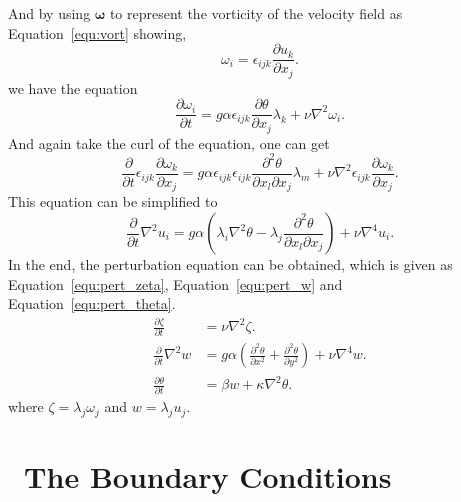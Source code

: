 And by using \(\boldsymbol{\omega}\) to represent the vorticity of the velocity field as Equation~\ref{equ:vort} showing, 
\begin{equation}
\omega_i=\epsilon_{ijk}\frac{\partial u_k}{\partial x_j}.
\label{equ:vort}
\end{equation}
we have the equation
\begin{equation}
\frac{\partial \omega_i}{\partial t}=g\alpha\epsilon_{ijk}\frac{\partial \theta}{\partial x_j}\lambda_k+\nu\nabla^2\omega_i.
\end{equation}
And again take the curl of the equation, one can get
\begin{equation}
\frac{\partial}{\partial t}\epsilon_{ijk}\frac{\partial \omega_k}{\partial x_j}=g\alpha\epsilon_{ijk}\epsilon_{ijk}\frac{\partial^2\theta}{\partial x_l \partial x_j}\lambda_m+\nu\nabla^2\epsilon_{ijk}\frac{\partial \omega_k}{\partial x_j}.
\end{equation}
This equation can be simplified to
\begin{equation}
\frac{\partial}{\partial t}\nabla^2 u_i=g\alpha\left( \lambda_i\nabla^2\theta-\lambda_j\frac{\partial^2\theta}{\partial x_l \partial x_j} \right)+\nu\nabla^4 u_i.
\end{equation}
In the end, the perturbation equation can be obtained, which is given as Equation~\ref{equ:pert_zeta}, Equation~\ref{equ:pert_w} and Equation~\ref{equ:pert_theta}. 
\begin{align}
\frac{\partial\zeta}{\partial t}&=\nu\nabla^2\zeta. \label{equ:pert_zeta} \\
\frac{\partial}{\partial t}\nabla^2 w&=g\alpha\left( \frac{\partial^2\theta}{\partial x^2}+\frac{\partial^2\theta}{\partial y^2} \right)+\nu\nabla^4 w. \label{equ:pert_w} \\
\frac{\partial \theta}{\partial t}&=\beta w+\kappa\nabla^2\theta. \label{equ:pert_theta}
\end{align}
where \(\zeta=\lambda_j\omega_j\) and \(w=\lambda_j u_j\).\par

\section{~\label{chap:02:boundary_conditions}The Boundary Conditions}

